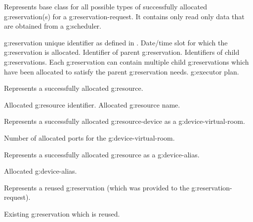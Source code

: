 \begin{Api}
Represents base class for all possible types of successfully allocated \gls{g:reservation}(s) for a \gls{g:reservation-request}. It contains only read only data that are obtained from a \gls{g:scheduler}.
\begin{ApiClassAttributes}
 \Gls{g:reservation} unique identifier as defined in .
 Date/time slot for which the \gls{g:reservation} is allocated.
 Identifier of parent \gls{g:reservation}.
 Identifiers of child \glspl{g:reservation}. Each \gls{g:reservation} can contain multiple child \glspl{g:reservation} which have been allocated to satisfy the parent \gls{g:reservation} needs.
 \Gls{g:executor} plan.
\end{ApiClassAttributes}

Represents a successfully allocated \gls{g:resource}.
\begin{ApiClassAttributes}
 Allocated \gls{g:resource} identifier.
 Allocated \gls{g:resource} name. 
\end{ApiClassAttributes}

Represents a successfully allocated \gls{g:resource-device} as a \gls{g:device-virtual-room}.
\begin{ApiClassAttributes}
 Number of allocated ports for the \gls{g:device-virtual-room}.
\end{ApiClassAttributes}

Represents a successfully allocated \gls{g:resource} as a \gls{g:device-alias}.
\begin{ApiClassAttributes}
 Allocated \gls{g:device-alias}.
\end{ApiClassAttributes}

Represents a reused \gls{g:reservation} (which was provided to the \gls{g:reservation-request}).
\begin{ApiClassAttributes}
 Existing \gls{g:reservation} which is reused.
\end{ApiClassAttributes}


\end{Api}
